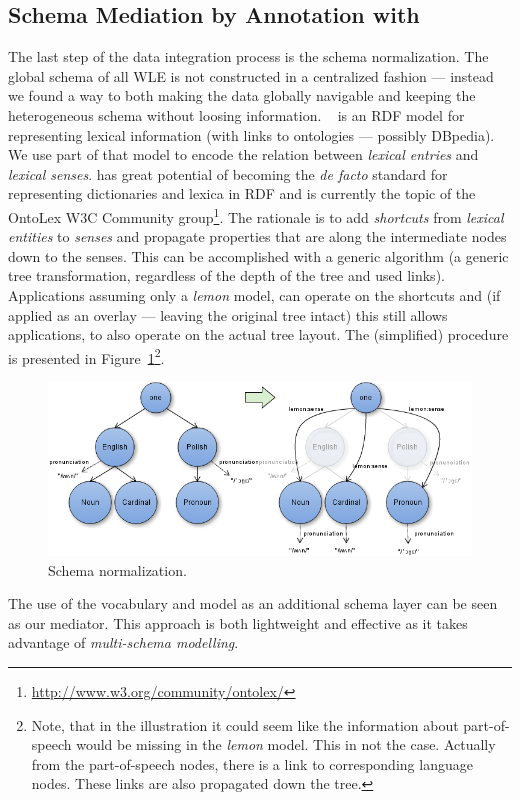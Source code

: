\subsection{Schema Mediation by Annotation with \lemonnospace}
\label{sec:lemon}
The last step of the data integration process is the schema normalization.
The global schema of all WLE is not constructed in a centralized fashion --- instead we found a way to both making the data globally navigable and keeping the heterogeneous schema without loosing information.
\lemonnospace~\cite{lemon-eswc} is an RDF model for representing lexical information (with links to ontologies --- possibly DBpedia). 
We use part of that model to encode the relation between \textit{lexical entries} and \textit{lexical senses}.
\lemon has great potential of becoming the \textit{de facto} standard for representing dictionaries and lexica in RDF and is currently the topic of the OntoLex W3C Community group\footnote{\url{http://www.w3.org/community/ontolex/}}. 
The rationale is to add \textit{shortcuts} from \textit{lexical entities} to \textit{senses} and propagate properties that are along the intermediate nodes down to the senses.
This can be accomplished with a generic algorithm (a generic tree transformation, regardless of the depth of the tree and used links).
Applications assuming only a \textit{lemon} model, can operate on the shortcuts and (if applied as an overlay --- leaving the original tree intact) this still allows applications, to also operate on the actual tree layout.
The (simplified) procedure is presented in Figure~\ref{fig:lemon}\footnote{Note, that in the illustration it could seem like the information about part-of-speech would be missing in the \textit{lemon} model. This in not the case. Actually from the part-of-speech nodes, there is a link to corresponding language nodes.
These links are also propagated down the tree.}. 
\begin{figure}[tb]
\centering
\includegraphics[width=\textwidth]{./images/lemon.png}
\caption{Schema normalization.}
\label{fig:lemon}
\end{figure}
The use of the \lemon vocabulary and model as an additional schema layer can be seen as our mediator.
This approach is both lightweight and effective as it takes advantage of \textit{multi-schema modelling}.

